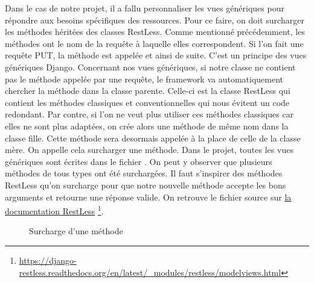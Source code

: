 \documentclass[letterpaper,10pt,oneside]{sphinxmanual}
\begin{document}
Dans le cas de notre projet, il a fallu personnaliser les vues génériques pour répondre aux besoins spécifiques des ressources. Pour ce faire, on doit surcharger les méthodes héritées des classes RestLess. Comme mentionné précédemment, les méthodes ont le nom de la requête à laquelle elles correspondent. Si l'on fait une requête PUT, la méthode  est appelée et ainsi de suite. C'est un principe des vues génériques Django. Concernant nos vues génériques, si notre classe ne contient pas le méthode appelée par une requête, le framework va automatiquement chercher la méthode dans la classe parente. Celle-ci est la classe RestLess qui contient les méthodes classiques et conventionnelles qui nous évitent un code redondant. Par contre, si l'on ne veut plus utiliser ces méthodes classiques car elles ne sont plus adaptées, on crée alors une méthode de même nom dans la classe fille. Cette méthode sera desormais appelée à la place de celle de la classe mère. On appelle cela surcharger une méthode. Dans le projet, toutes les vues génériques sont écrites dans le fichier . On peut y observer que plusieurs méthodes de tous types ont été surchargées. Il faut s'inspirer des méthodes RestLess qu'on surcharge pour que notre nouvelle méthode accepte les bons arguments et retourne une réponse valide. On retrouve le fichier source sur \href{https://django-restless.readthedocs.org/en/latest/\_modules/restless/modelviews.html}{la documentation RestLess} \footnote{
\href{https://django-restless.readthedocs.org/en/latest/\_modules/restless/modelviews.html}{https://django-restless.readthedocs.org/en/latest/\_modules/restless/modelviews.html}
}.
\begin{figure}[htbp]
\centering
\capstart

\caption{Surcharge d'une méthode}\end{figure}
\end{document}
